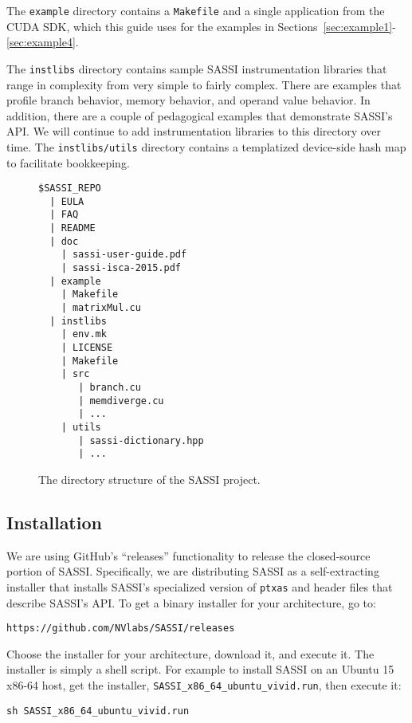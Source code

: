 The \texttt{example} directory contains a \texttt{Makefile} and a
single application from the CUDA SDK, which this guide uses for the
examples in Sections~\ref{sec:example1}-\ref{sec:example4}.

The \texttt{instlibs} directory contains sample SASSI instrumentation
libraries that range in complexity from very simple to fairly complex.
There are examples that profile branch behavior, memory behavior, and
operand value behavior.  In addition, there are a couple of
pedagogical examples that demonstrate SASSI's API.  We will continue
to add instrumentation libraries to this directory over time.  The
\texttt{instlibs/utils} directory contains a templatized device-side
hash map to facilitate bookkeeping.

\begin{figure*}
\center
\begin{verbatim}
$SASSI_REPO
  | EULA
  | FAQ
  | README
  | doc
    | sassi-user-guide.pdf
    | sassi-isca-2015.pdf
  | example
    | Makefile
    | matrixMul.cu 
  | instlibs
    | env.mk
    | LICENSE
    | Makefile
    | src
       | branch.cu
       | memdiverge.cu
       | ...
    | utils
       | sassi-dictionary.hpp
       | ...
\end{verbatim}
\caption{The directory structure of the SASSI project.}
\label{fig:structure}
\end{figure*}

\subsection{Installation}

We are using GitHub's ``releases'' functionality to release the
closed-source portion of SASSI.  Specifically, we are distributing
SASSI as a self-extracting installer that installs SASSI's specialized
version of \texttt{ptxas} and header files that describe
SASSI's API.  To get a binary installer for your architecture, go to:\\
\begin{center}
\texttt{https://github.com/NVlabs/SASSI/releases}
\end{center}
Choose the installer for your architecture, download it, and execute
it.  The installer is simply a shell script. For example to install SASSI
on an Ubuntu 15 x86-64 host, get the installer,
\texttt{SASSI\_x86\_64\_ubuntu\_vivid.run}, then execute it:
\begin{center}
\texttt{sh SASSI\_x86\_64\_ubuntu\_vivid.run}
\end{center}


